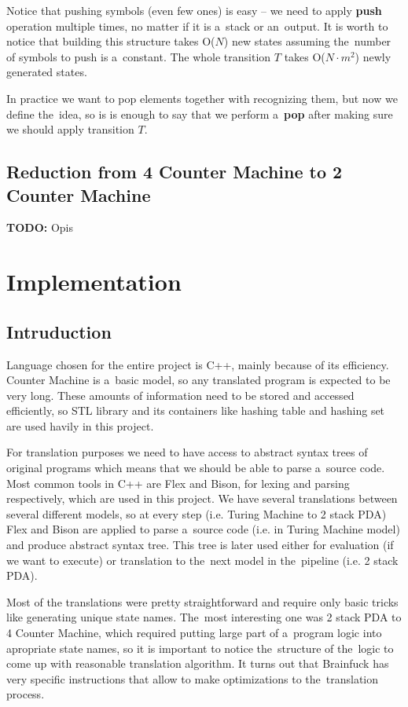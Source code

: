 \documentclass[english,shortabstract,mgr]{iithesis}
\newcommand{\todo}[1]{\textbf{TODO:} #1}
\begin{document}
Notice that pushing symbols (even few ones) is easy -- we need to apply \textbf{push} operation
multiple times, no matter if it is a~stack or an~output. It is worth to notice
that building this structure takes O($N$) new states assuming the~number of symbols
to push is a~constant. The whole transition $T$ takes O($N \cdot m^2$) newly
generated states.

In practice we want to pop elements together with recognizing them, but now we define the~idea, so
is is enough to say that we perform a~\textbf{pop} after making sure we should apply transition $T$.

\section {Reduction from 4 Counter Machine to 2 Counter Machine}

\todo{Opis}


\chapter{Implementation}

\section{Intruduction}

Language chosen for the entire project is C++, mainly because of its efficiency. Counter Machine
is a~basic model, so any translated program is expected to be very long. These amounts of information
need to be stored and accessed efficiently, so STL library and its containers like hashing table
and hashing set are used havily in this project.

For translation purposes we need to have access to abstract syntax trees of original programs which
means that we should be able to parse a~source code. Most common tools in C++ are Flex and Bison,
for lexing and parsing respectively, which are used in this project. We have several translations
between several different models, so at every step (i.e. Turing Machine to 2 stack PDA) Flex and Bison
are applied to parse a~source code (i.e. in Turing Machine model) and produce abstract syntax tree.
This tree is later used either for evaluation (if we want to execute) or translation to the~next
model in the~pipeline (i.e. 2 stack PDA).

Most of the translations were pretty straightforward and require only basic tricks like
generating unique state names. The~most interesting one was 2 stack PDA to 4 Counter Machine,
which required putting large part of a~program logic into apropriate state names, so it is important
to notice the~structure of the~logic to come up with reasonable translation algorithm.
It turns out that Brainfuck has very specific instructions that allow to make optimizations
to the~translation process.
\end{document}
